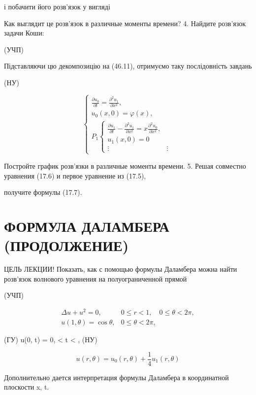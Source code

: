\documentclass[
  ukrainian,
]{article}
\begin{document}
і побачити його розв'язок у вигляді

Как выглядит це розв'язок в различные моменты времени? 4. Найдите
розв'язок задачи Коши:

(УЧП)

Підставляючи цю декомпозицію на (46.11), отримуємо таку послідовність
завдань

(НУ)

\[
\begin{cases} \frac{\partial u_{0}}{\partial t} = \frac{\partial^{2} u_{1}}{\partial x^{2}}, \\ u_{0}(x, 0) = \varphi(x), \\ P_{1} \begin{cases} \frac{\partial u_{1}}{\partial t} - \frac{\partial^{2} u_{1}}{\partial x^{2}} = x \frac{\partial^{2} u_{0}}{\partial x^{2}}, \\ u_{1}(x, 0) = 0 \\ \vdots & \vdots \end{cases} \end{cases}
\]

Постройте график розв'язки в различные моменты времени. 5. Решая
совместно уравнения (17.6) и первое уравнение из (17.5),

получите формулы (17.7).

\section{ФОРМУЛА ДАЛАМБЕРА
(ПРОДОЛЖЕНИЕ)}\label{ux444ux43eux440ux43cux443ux43bux430-ux434ux430ux43bux430ux43cux431ux435ux440ux430-ux43fux440ux43eux434ux43eux43bux436ux435ux43dux438ux435}

ЦЕЛЬ ЛЕКЦИИ! Показать, как с помощью формулы Даламбера можна найти
розв'язок волнового уравнения на полуограниченной прямой

(УЧП)

\[
\begin{aligned} \Delta u + u^2 = 0, & 0 \leqslant r < 1, \quad 0 \leqslant \theta < 2\pi, \\ u(1, \theta) = \cos \theta, & 0 \leqslant \theta < 2\pi, \end{aligned}
\]

(ГУ) u(0, t) = 0,  \textless{} t \textless{} \infty, (НУ)

\[
u(r, \theta) = u_0(r, \theta) + \frac{1}{4}u_1(r, \theta)
\]

Дополнительно дается интерпретация формулы Даламбера в координатной
плоскости x, t.
\end{document}
